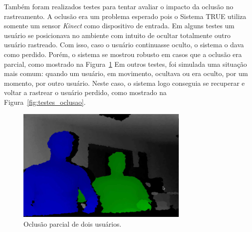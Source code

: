 	Também foram realizados testes para tentar avaliar o impacto da oclusão no rastreamento. A oclusão era um problema esperado pois o Sistema TRUE utiliza somente um sensor \textit{Kinect} como dispositivo de entrada. Em alguns testes um usuário se posicionava no ambiente com intuito de ocultar totalmente outro usuário rastreado. Com isso, caso o usuário continuasse oculto, o sistema o dava como perdido. Porém, o sistema se mostrou robusto em casos que a oclusão era parcial, como mostrado na Figura~\ref{fig:testes_oclusao_sucesso} Em outros testes, foi simulada uma situação mais comum: quando um usuário, em movimento, ocultava ou era oculto, por um momento, por outro usuário. Neste caso, o sistema logo conseguia se recuperar e voltar a rastrear o usuário perdido, como mostrado na Figura~\ref{fig:testes_oclusao}.
		
\begin{figure}[htb]
			\begin{center}
				\includegraphics[width=0.75\textwidth]{figuras/5.Testes/oclusao/oclusao_corretamente.png}
			\end{center}
			\caption{Oclusão parcial de dois usuários.}
			\label{fig:testes_oclusao_sucesso}
		\end{figure}
	
